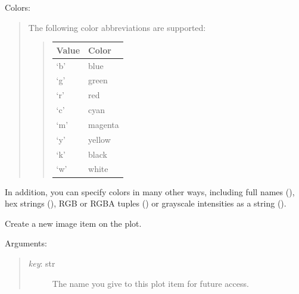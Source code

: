 \documentclass[letterpaper,10pt,english]{sphinxmanual}
\begin{document}
\begin{fulllineitems}
\begin{fulllineitems}
\begin{quote}
\begin{description}
\end{description}
\end{quote}

Colors:
\begin{quote}

The following color abbreviations are supported:
\begin{quote}

\begin{tabulary}{\linewidth}{|L|L|}
\hline
\textbf{
Value
} & \textbf{
Color
}\\\hline

`b'
 & 
blue
\\\hline

`g'
 & 
green
\\\hline

`r'
 & 
red
\\\hline

`c'
 & 
cyan
\\\hline

`m'
 & 
magenta
\\\hline

`y'
 & 
yellow
\\\hline

`k'
 & 
black
\\\hline

`w'
 & 
white
\\\hline
\end{tabulary}

\end{quote}
\end{quote}

In addition, you can specify colors in many other ways, including 
full names (), hex strings (), RGB or 
RGBA tuples () or grayscale intensities as a string ().

\end{fulllineitems}


\begin{fulllineitems}
\label{api:controls.Plot2D.new_image}
Create a new image item on the plot.

Arguments:
\begin{quote}
\begin{description}
\item[{\emph{key}: str}] \leavevmode
The name you give to this plot item for future access.


\end{description}
\end{quote}
\end{fulllineitems}
\end{fulllineitems}
\end{document}
